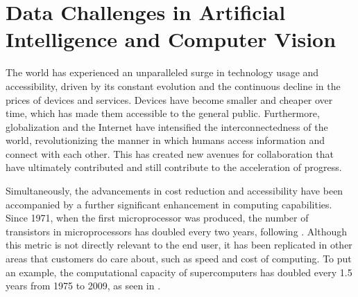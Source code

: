 
\section{Data Challenges in Artificial Intelligence and Computer Vision}

The world has experienced an unparalleled surge in technology usage and accessibility, driven by its constant evolution and the continuous decline in the prices of devices and services. Devices have become smaller and cheaper over time, which has made them accessible to the general public. Furthermore, globalization and the Internet have intensified the interconnectedness of the world, revolutionizing the manner in which humans access information and connect with each other. This has created new avenues for collaboration that have ultimately contributed and still contribute to the acceleration of progress.


Simultaneously, the advancements in cost reduction and accessibility have been accompanied by a further significant enhancement in computing capabilities. Since 1971, when the first microprocessor was produced, the number of transistors in microprocessors has doubled every two years, following . Although this metric is not directly relevant to the end user, it has been replicated in other areas that customers do care about, such as speed and cost of computing. To put an example, the computational capacity of supercomputers has doubled every 1.5 years from 1975 to 2009, as seen in .

